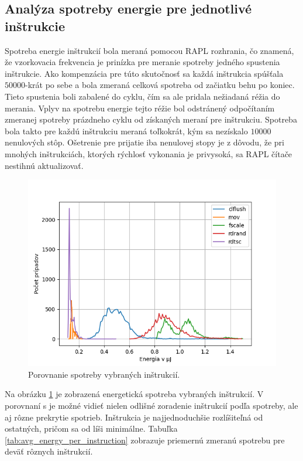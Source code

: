 \subsection{Analýza spotreby energie pre jednotlivé inštrukcie}
Spotreba energie inštrukcií bola meraná pomocou RAPL rozhrania, čo znamená, že vzorkovacia frekvencia je prinízka pre meranie spotreby jedného spustenia inštrukcie.
Ako kompenzácia pre túto skutočnosť sa každá inštrukcia spúšťala $50000$-krát po sebe a bola zmeraná celková spotreba od začiatku behu po koniec. Tieto spustenia
boli zabalené do cyklu, čím sa ale pridala nežiadaná réžia do merania. Vplyv na spotrebu energie tejto réžie bol odstránený odpočítaním zmeranej spotreby
prázdneho cyklu od získaných meraní pre inštrukciu. Spotreba bola takto pre každú inštrukciu meraná toľkokrát, kým sa nezískalo $10000$ nenulových stôp.
Ošetrenie pre prijatie iba nenulovej stopy je z dôvodu, že pri mnohých inštrukciách, ktorých rýchlosť vykonania je privysoká, sa RAPL čítače nestihnú aktualizovať.

\begin{figure}\label{img:instruction_comparison}
  \centering
  \includegraphics[scale=0.7]{./obrazky-figures/instr_comparison.png}
  \caption{Porovnanie spotreby vybraných inštrukcií.}
\end{figure}

Na obrázku \ref{img:instruction_comparison} je zobrazená energetická spotreba vybraných inštrukcií. V porovnaní s \cite{Platypus} je možné vidieť nielen odlišné
zoradenie inštrukcií podľa spotreby, ale aj rôzne prekrytie spotrieb. Inštrukcia  je najjednoduchšie rozlíšiteľná od ostatných, pričom  sa
od  líši minimálne. Tabuľka \ref{tab:avg_energy_per_instruction} zobrazuje priemernú zmeranú spotrebu pre deväť rôznych inštrukcií.

